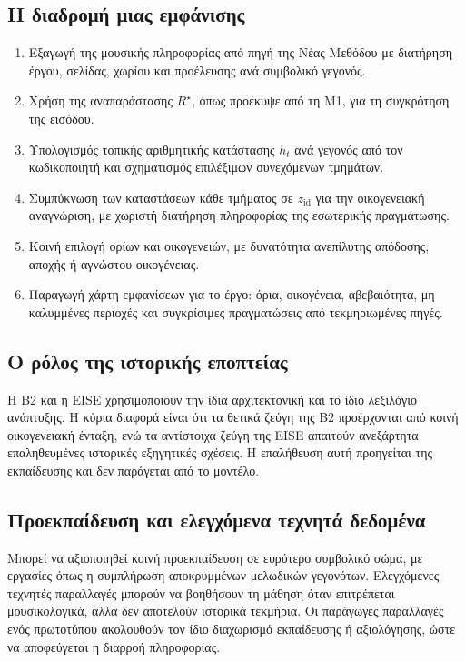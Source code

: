 \documentclass[11pt,a4paper]{extarticle}
\begin{document}
\subsection*{Η διαδρομή μιας εμφάνισης}
\begin{enumerate}
\item Εξαγωγή της μουσικής πληροφορίας από πηγή της Νέας Μεθόδου με διατήρηση έργου, σελίδας, χωρίου και προέλευσης ανά συμβολικό γεγονός.
\item Χρήση της αναπαράστασης \(R^\star\), όπως προέκυψε από τη M1, για τη συγκρότηση της εισόδου.
\item Υπολογισμός τοπικής αριθμητικής κατάστασης \(h_t\) ανά γεγονός από τον κωδικοποιητή και σχηματισμός επιλέξιμων συνεχόμενων τμημάτων.
\item Συμπύκνωση των καταστάσεων κάθε τμήματος σε \(z_{\mathrm{id}}\) για την οικογενειακή αναγνώριση, με χωριστή διατήρηση πληροφορίας της εσωτερικής πραγμάτωσης.
\item Κοινή επιλογή ορίων και οικογενειών, με δυνατότητα ανεπίλυτης απόδοσης, αποχής ή αγνώστου οικογένειας.
\item Παραγωγή χάρτη εμφανίσεων για το έργο: όρια, οικογένεια, αβεβαιότητα, μη καλυμμένες περιοχές και συγκρίσιμες πραγματώσεις από τεκμηριωμένες πηγές.
\end{enumerate}

\subsection*{Ο ρόλος της ιστορικής εποπτείας}
Η B2 και η EISE χρησιμοποιούν την ίδια αρχιτεκτονική και το ίδιο λεξιλόγιο ανάπτυξης. Η κύρια διαφορά είναι ότι τα θετικά ζεύγη της B2 προέρχονται από κοινή οικογενειακή ένταξη, ενώ τα αντίστοιχα ζεύγη της EISE απαιτούν ανεξάρτητα επαληθευμένες ιστορικές εξηγητικές σχέσεις. Η επαλήθευση αυτή προηγείται της εκπαίδευσης και δεν παράγεται από το μοντέλο.

\subsection*{Προεκπαίδευση και ελεγχόμενα τεχνητά δεδομένα}
Μπορεί να αξιοποιηθεί κοινή προεκπαίδευση σε ευρύτερο συμβολικό σώμα, με εργασίες όπως η συμπλήρωση αποκρυμμένων μελωδικών γεγονότων. Ελεγχόμενες τεχνητές παραλλαγές μπορούν να βοηθήσουν τη μάθηση όταν επιτρέπεται μουσικολογικά, αλλά δεν αποτελούν ιστορικά τεκμήρια. Οι παράγωγες παραλλαγές ενός πρωτοτύπου ακολουθούν τον ίδιο διαχωρισμό εκπαίδευσης ή αξιολόγησης, ώστε να αποφεύγεται η διαρροή πληροφορίας.
\end{document}
